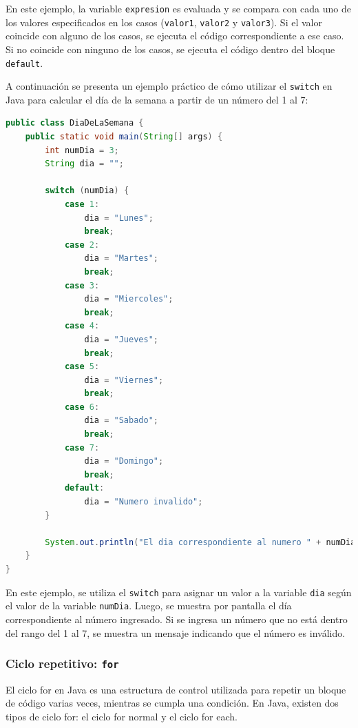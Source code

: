 \documentclass[executivepaper]{article}
\begin{document}
En este ejemplo, la variable \texttt{expresion} es evaluada y se compara con cada uno de los valores especificados en los casos (\texttt{valor1}, \texttt{valor2} y \texttt{valor3}). Si el valor coincide con alguno de los casos, se ejecuta el código correspondiente a ese caso. Si no coincide con ninguno de los casos, se ejecuta el código dentro del bloque \texttt{default}.

A continuación se presenta un ejemplo práctico de cómo utilizar el \texttt{switch} en Java para calcular el día de la semana a partir de un número del 1 al 7:

\begin{lstlisting}[language=Java]
public class DiaDeLaSemana {
    public static void main(String[] args) {
        int numDia = 3;
        String dia = "";

        switch (numDia) {
            case 1:
                dia = "Lunes";
                break;
            case 2:
                dia = "Martes";
                break;
            case 3:
                dia = "Miercoles";
                break;
            case 4:
                dia = "Jueves";
                break;
            case 5:
                dia = "Viernes";
                break;
            case 6:
                dia = "Sabado";
                break;
            case 7:
                dia = "Domingo";
                break;
            default:
                dia = "Numero invalido";
        }

        System.out.println("El dia correspondiente al numero " + numDia + " es " + dia + ".");
    }
}
\end{lstlisting}

En este ejemplo, se utiliza el \texttt{switch} para asignar un valor a la variable \texttt{dia} según el valor de la variable \texttt{numDia}. Luego, se muestra por pantalla el día correspondiente al número ingresado. Si se ingresa un número que no está dentro del rango del 1 al 7, se muestra un mensaje indicando que el número es inválido.

\subsubsection{Ciclo repetitivo: \texttt{for}}

El ciclo for en Java es una estructura de control utilizada para repetir un bloque de código varias veces, mientras se cumpla una condición. En Java, existen dos tipos de ciclo for: el ciclo for normal y el ciclo for each.
\end{document}
